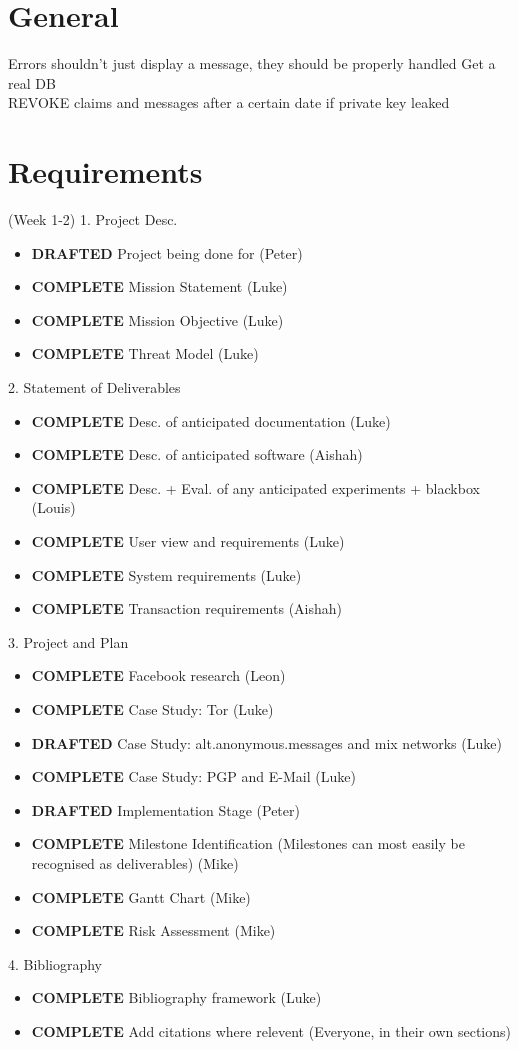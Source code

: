 \section{General}
Errors shouldn't just display a message, they should be properly handled
Get a real DB\\
REVOKE claims and messages after a certain date if private key leaked\\

\section{Requirements} (Week 1-2)
1. Project Desc.
\begin{itemize}
\item \textbf{DRAFTED}  Project being done for (Peter)
\item \textbf{COMPLETE} Mission Statement (Luke)
\item \textbf{COMPLETE} Mission Objective (Luke)
\item \textbf{COMPLETE} Threat Model (Luke)
\end{itemize}

2. Statement of Deliverables
\begin{itemize}
\item \textbf{COMPLETE}    Desc. of anticipated documentation (Luke)
\item \textbf{COMPLETE}    Desc. of anticipated software (Aishah)
\item \textbf{COMPLETE}    Desc. + Eval. of any anticipated experiments + blackbox (Louis)
\item \textbf{COMPLETE}    User view and requirements (Luke)
\item \textbf{COMPLETE}    System requirements (Luke)
\item \textbf{COMPLETE}    Transaction requirements (Aishah)
\end{itemize}

3. Project and Plan
\begin{itemize}
\item \textbf{COMPLETE}    Facebook research (Leon)
\item \textbf{COMPLETE}    Case Study: Tor (Luke)
\item \textbf{DRAFTED}     Case Study: alt.anonymous.messages and mix networks (Luke)
\item \textbf{COMPLETE}    Case Study: PGP and E-Mail (Luke)
\item \textbf{DRAFTED}     Implementation Stage (Peter)
\item \textbf{COMPLETE}    Milestone Identification (Milestones can most easily be recognised as deliverables) (Mike)
\item \textbf{COMPLETE}    Gantt Chart (Mike)
\item \textbf{COMPLETE}    Risk Assessment (Mike)
\end{itemize}

4. Bibliography
\begin{itemize}
\item \textbf{COMPLETE}   Bibliography framework (Luke)
\item \textbf{COMPLETE} Add citations where relevent (Everyone, in their own sections)
\end{itemize}
